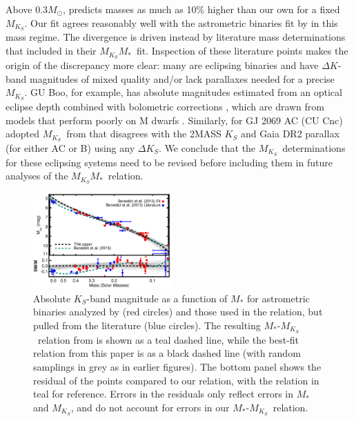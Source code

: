 \documentclass[twocolumn]{aastex62}
\newcommand{\mks}{$M_{K_S}$}
\newcommand{\mmk}{$M_{K_S}$\textendash$M_*$}
\begin{document}
 Above 0.3$M_\odot$, \citet{Benedict2016} predicts masses as much as 10\% higher than our own for a fixed \mks. Our fit agrees reasonably well with the astrometric binaries fit by \citet{Benedict2016} in this mass regime. The divergence is driven instead by literature mass determinations that \citet{Benedict2016} included in their \mmk\ fit. Inspection of these literature points makes the origin of the discrepancy more clear: many are eclipsing binaries and have $\Delta K$-band magnitudes of mixed quality and/or lack parallaxes needed for a precise \mks. GU Boo, for example, has absolute magnitudes estimated from an optical eclipse depth combined with bolometric corrections \citep{Lopez2005}, which are drawn from models that perform poorly on M dwarfs \citep{1998A&AS..130...65L,Hauschildt1999}. Similarly, for GJ 2069 AC (CU Cnc) \citet{Benedict2016} adopted \mks\ from \citet{Ribas2003} that disagrees with the 2MASS $K_S$ and Gaia DR2 parallax (for either AC or B) using any $\Delta K_S$. We conclude that the \mks\ determinations for these eclipsing systems need to be revised before including them in future analyses of the \mmk\ relation. 


\begin{figure}[htb]
\begin{center}
\includegraphics[width=0.47\textwidth]{Benedict_comp.eps}
\caption{Absolute $K_S$-band magnitude as a function of $M_*$ for astrometric binaries analyzed by \citet{Benedict2016} (red circles) and those used in the \citet{Benedict2016} relation, but pulled from the literature (blue circles). The resulting $M_*$-\mks\ relation from \citet{Benedict2016} is shown as a teal dashed line, while the best-fit relation from this paper is as a black dashed line (with random samplings in grey as in earlier figures). The bottom panel shows the residual of the \citet{Benedict2016} points compared to our relation, with the \citet{Benedict2016} relation in teal for reference. Errors in the residuals only reflect errors in $M_*$ and \mks, and do not account for errors in our $M_*$-\mks\ relation. }
\label{fig:benedict}
\end{center}
\end{figure}
\end{document}
